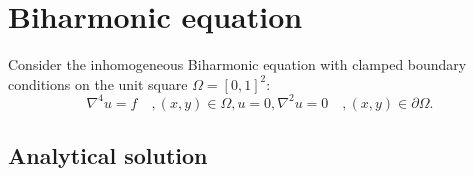 \section{Biharmonic equation}
\label{sec:PDE}

\newtheorem{theorem}{Theorem}
\newtheorem{lemma}{Lemma}
\theoremstyle{remark}
\newtheorem*{remark}{Remark}

\theoremstyle{definition}
\newtheorem{definition}{Definition}

Consider the inhomogeneous Biharmonic equation with clamped boundary conditions on the unit square $\Omega = [0, 1]^2$:
\begin{subequations}\label{eq:PDE}
  \begin{equation}
    \nabla^4 u = f \quad, (x, y) \in \Omega,
  \end{equation}
  \begin{equation}
    u = 0, \nabla^2u = 0 \quad, (x, y) \in \partial\Omega.
  \end{equation}
\end{subequations}

\subsection{Analytical solution}

